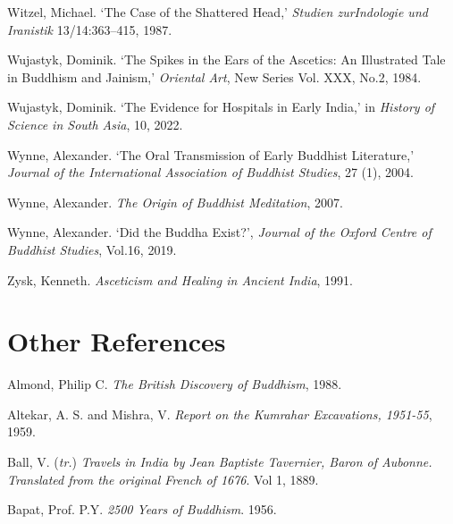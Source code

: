 \label{footprints_split_022.html_Witzelux201987}
Witzel, Michael. `The Case of the Shattered Head,' \emph{Studien
zurIndologie und Iranistik} 13/14:363--415, 1987.

\label{footprints_split_022.html_Wujastykux201984}
Wujastyk, Dominik. `The Spikes in the Ears of the Ascetics: An
Illustrated Tale in Buddhism and Jainism,' \emph{Oriental Art}, New
Series Vol. XXX, No.2, 1984.

\label{footprints_split_022.html_Wujastykux202022}
Wujastyk, Dominik. `The Evidence for Hospitals in Early India,' in
\emph{History of Science in South Asia}, 10, 2022.

Wynne, Alexander. `The Oral Transmission of Early Buddhist Literature,'
\emph{Journal of the International Association of Buddhist Studies}, 27
(1), 2004.

\label{footprints_split_022.html_Wynneux202007}
Wynne, Alexander. \emph{The Origin of Buddhist Meditation}, 2007.

\label{footprints_split_022.html_Wynneux202019}
Wynne, Alexander. `Did the Buddha Exist?', \emph{Journal of the Oxford
Centre of Buddhist Studies}, Vol.16, 2019.

\label{footprints_split_022.html_Zyskux201991}
Zysk, Kenneth. \emph{Asceticism and Healing in Ancient India}, 1991.

\label{footprints_split_022.html_calibre_pb_45}

\label{footprints_split_023.html}{}

\section{Other
References}\label{footprints_split_023.html_TOCTarget999-5}

\label{footprints_split_023.html_Almondux201988}
Almond, Philip C. \emph{The British Discovery of Buddhism}, 1988.

\label{footprints_split_023.html_Altekar-Mishraux201959}
Altekar, A. S. and Mishra, V. \emph{Report on the Kumrahar Excavations,
1951-55}, 1959.

\label{footprints_split_023.html_Ballux201889}
Ball, V. (\emph{tr.}) \emph{Travels in India by Jean Baptiste Tavernier,
Baron of Aubonne. Translated from the original French of 1676}. Vol 1,
1889.

\label{footprints_split_023.html_Bapatux201956}
Bapat, Prof. P.Y. \emph{2500 Years of Buddhism}. 1956.

